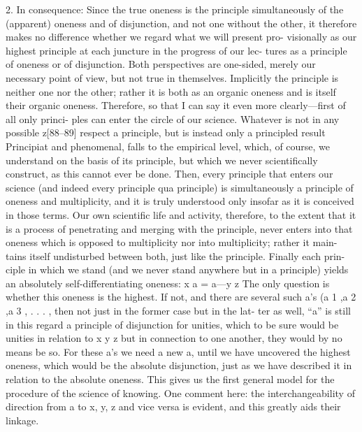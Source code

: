 2. In consequence: Since the true oneness is the principle simultaneously
of the (apparent) oneness and of disjunction, and not one without the other,
it therefore makes no difference whether we regard what we will present pro-
visionally as our highest principle at each juncture in the progress of our lec-
tures as a principle of oneness or of disjunction.
Both perspectives are one-sided,
merely our necessary point of view, but not true in themselves.
Implicitly the
principle is neither one nor the other; rather it is both as an organic oneness and
is itself their organic oneness.
Therefore, so that I can say it even more clearly—first of all only princi-
ples can enter the circle of our science.
Whatever is not in any possible
z[88–89] respect a principle, but is instead only a principled result {Principiat}
and phenomenal, falls to the empirical level, which, of course, we understand
on the basis of its principle, but which we never scientifically construct, as this
cannot ever be done.
Then, every principle that enters our science (and indeed
every principle qua principle) is simultaneously a principle of oneness and
multiplicity, and it is truly understood only insofar as it is conceived in those
terms.
Our own scientific life and activity, therefore, to the extent that it is a
process of penetrating and merging with the principle, never enters into that
oneness which is opposed to multiplicity nor into multiplicity; rather it main-
tains itself undisturbed between both, just like the principle.
Finally each prin-
ciple in which we stand (and we never stand anywhere but in a principle)
yields an absolutely self-differentiating oneness:
x
a = a—y
z
The only question is whether this oneness is the highest.
If not, and there
are several such a’s (a 1 ,a 2 ,a 3 , .
.
.
, then not just in the former case but in the lat-
ter as well, “a” is still in this regard a principle of disjunction for unities, which
to be sure would be unities in relation to
x
y
z
but in connection to one another, they would by no means be so.
For these a’s
we need a new a, until we have uncovered the highest oneness, which would
be the absolute disjunction, just as we have described it in relation to the
absolute oneness.
This gives us the first general model for the procedure of the
science of knowing.
One comment here: the interchangeability of direction from a to x, y, z
and vice versa is evident, and this greatly aids their linkage.

